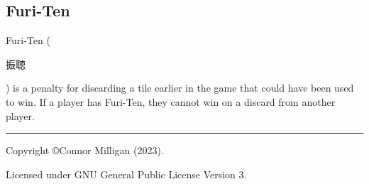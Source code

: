 \documentclass[8pt,landscape]{article}
\begin{document}
\begin{minipage}[t][.8\textheight][t]{\textwidth}
\begin{multicols*}{3}
    \section{Furi-Ten}
    Furi-Ten (\begin{CJK}{UTF8}{min}振聴\end{CJK}) is a penalty for discarding a tile earlier in the game that could have been used to win.
    If a player has Furi-Ten, they cannot win on a discard from another player.\\

    \rule{0.3\linewidth}{0.25pt}
    \scriptsize
    
    Copyright \copyright Connor Milligan (2023).

    Licensed under GNU General Public License Version 3.
    

\end{multicols*}
\end{minipage}
\end{document}
